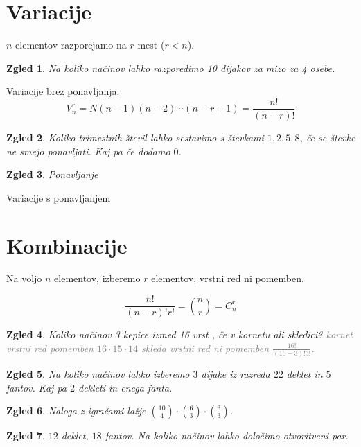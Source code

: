 \documentclass{article}
\newtheorem*{zgled}{Zgled}
\begin{document}
\section{Variacije}

$n$ elementov razporejamo na $r$ mest ($r<n$).

\begin{zgled}
    Na koliko načinov lahko razporedimo 10 dijakov za mizo za 4 osebe.
\end{zgled}

Variacije brez ponavljanja:
\[V_n ^r = N(n-1)(n-2)\cdots (n-r+1)=\frac{n!}{(n-r)!}\]

\begin{zgled}
    Koliko trimestnih števil lahko sestavimo s števkami $1,2,5,8$, če se števke ne smejo ponavljati. Kaj pa če dodamo $0$.
\end{zgled}

\begin{zgled}
    Ponavljanje
\end{zgled}

Variacije s ponavljanjem

\section{Kombinacije}

Na voljo $n$ elementov, izberemo $r$ elementov, vrstni red ni pomemben.

\[\frac{n!}{(n-r)!r!}=\binom{n}{r}=C_n ^r\]

\begin{zgled}
    Koliko načinov 3 kepice izmed 16 vrst , če v kornetu ali skledici? \textcolor{gray}{kornet vrstni red pomemben $16\cdot 15\cdot 14$ skleda vrstni red ni pomemben $\frac{16!}{(16-3)!3!}$.}
\end{zgled}

\begin{zgled}
    Na koliko načinov lahko izberemo $3$ dijake iz razreda $22$ deklet in $5$ fantov. Kaj pa $2$ dekleti in enega fanta. 
\end{zgled}

\begin{zgled}
    Naloga z igračami lažje $\binom{10}{4}\cdot\binom{6}{3}\cdot\binom{3}{3}$.
\end{zgled}

\begin{zgled}
    $12$ deklet, $18$ fantov. Na koliko načinov lahko določimo otvoritveni par.
\end{zgled}
\end{document}
